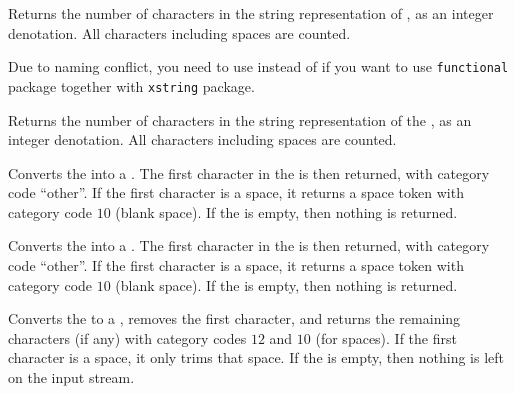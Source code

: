\documentclass[oneside]{book}
\begin{document}
\begin{function}{\StrCount}
\begin{syntax}
 
\end{syntax}
Returns the number of characters in the string representation of ,
as an integer denotation. All characters including spaces are counted.
\par
Due to naming conflict, you need to use  instead of 
if you want to use \verb!functional! package together with \verb!xstring! package.
\end{function}

\begin{function}{\StVarCount}
\begin{syntax}
 
\end{syntax}
Returns the number of characters in the string representation of the ,
as an integer denotation. All characters including spaces are counted.
\end{function}

\begin{function}{\StrHead}
\begin{syntax}
 
\end{syntax}
Converts the  into a .
The first character in the  is then returned,
with category code \enquote{other}. If the first character is a space,
it returns a space token with category code $10$ (blank space).
If the  is empty, then nothing is returned.
\end{function}

\begin{function}{\StrVarHead}
\begin{syntax}
 
\end{syntax}
Converts the  into a .
The first character in the  is then returned,
with category code \enquote{other}. If the first character is a space,
it returns a space token with category code $10$ (blank space).
If the  is empty, then nothing is returned.
\end{function}

\begin{function}{\StrTail}
\begin{syntax}
 
\end{syntax}
Converts the  to a , removes the first
character, and returns the remaining characters (if any)
with category codes $12$ and $10$ (for spaces).
If the first character is a space, it only trims that space.
If the  is empty,
then nothing is left on the input stream.
\end{function}
\end{document}
